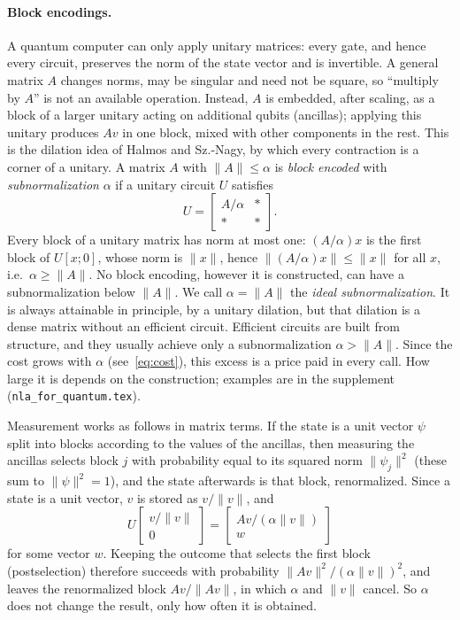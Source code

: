 \documentclass[11pt,a4paper]{article}
\theoremstyle{remark}
\begin{document}
\paragraph{Block encodings.} A quantum computer can only apply unitary
matrices: every gate, and hence every circuit, preserves the norm of the
state vector and is invertible. A general matrix $A$ changes norms, may be
singular and need not be square, so ``multiply by $A$'' is not an available
operation. Instead, $A$ is embedded, after scaling, as a block of a larger
unitary acting on additional qubits (ancillas); applying this unitary
produces $Av$ in one block, mixed with other components in the rest. This is
the dilation idea of Halmos and Sz.-Nagy, by which every contraction is a
corner of a unitary.
A matrix $A$ with $\|A\|\le\alpha$ is \emph{block encoded}
with \emph{subnormalization} $\alpha$ if a unitary circuit $U$ satisfies
\[
U=\begin{bmatrix}A/\alpha & *\\ * & *\end{bmatrix}.
\]
Every block of a unitary matrix has norm at most one: $(A/\alpha)x$ is the
first block of $U[x;0]$, whose norm is $\|x\|$, hence $\|(A/\alpha)x\|\le\|x\|$ for
all $x$, i.e.\ $\alpha\ge\|A\|$. No block encoding, however it is constructed, can
have a subnormalization below $\|A\|$. We call $\alpha=\|A\|$ the \emph{ideal
subnormalization}. It is always attainable in principle, by a unitary
dilation, but that dilation is a dense matrix without an efficient
circuit. Efficient circuits are built from structure, and they usually
achieve only a subnormalization $\alpha>\|A\|$. Since the cost grows with $\alpha$
(see~\eqref{eq:cost}), this excess is a price paid in every call. How large
it is depends on the construction; examples are in
the supplement (\texttt{nla\_for\_quantum.tex}).

Measurement works as follows in matrix terms. If the state is a unit
vector $\psi$ split into blocks according to the values of the ancillas, then
measuring the ancillas selects block $j$ with probability equal to its
squared norm $\|\psi_j\|^2$ (these sum to $\|\psi\|^2=1$), and the state afterwards is
that block, renormalized. Since a state is a unit vector, $v$ is stored as
$v/\|v\|$, and
\[
U\begin{bmatrix}v/\|v\|\\0\end{bmatrix}=\begin{bmatrix}Av/(\alpha\|v\|)\\ w\end{bmatrix}
\]
for some vector $w$. Keeping the outcome that selects the first block
(postselection) therefore succeeds with probability
$\|Av\|^2/(\alpha\|v\|)^2$, and leaves the renormalized block $Av/\|Av\|$, in which $\alpha$
and $\|v\|$ cancel. So $\alpha$ does not change the result, only how often it is
obtained.
\end{document}
